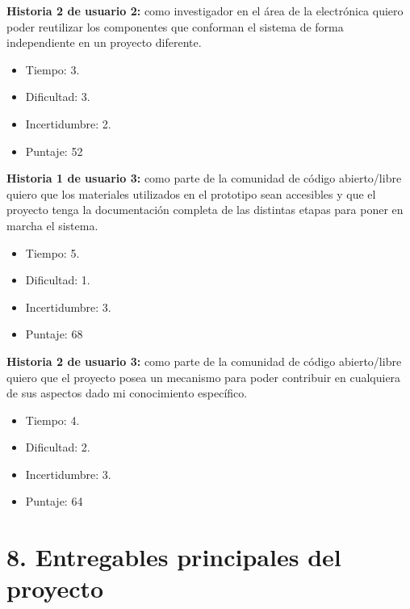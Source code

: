 \documentclass[
11pt, %
codirector, %
]{charter}
\begin{document}
\textbf{Historia 2 de usuario 2:} como investigador en el área de la electrónica quiero poder reutilizar los componentes que conforman el sistema de forma independiente en un proyecto diferente.

\begin{itemize}
	\item Tiempo: 3.
	\item Dificultad: 3.
	\item Incertidumbre: 2.
	\item Puntaje: 52
\end{itemize}

\textbf{Historia 1 de usuario 3:} como parte de la comunidad de código abierto/libre quiero que los materiales utilizados en el prototipo sean accesibles y que el proyecto tenga la documentación completa de las distintas etapas para poner en marcha el sistema.

\begin{itemize}
	\item Tiempo: 5.
	\item Dificultad: 1.
	\item Incertidumbre: 3.
	\item Puntaje: 68
\end{itemize}

\textbf{Historia 2 de usuario 3:} como parte de la comunidad de código abierto/libre quiero que el proyecto posea un mecanismo para poder contribuir en cualquiera de sus aspectos dado mi conocimiento específico.

\begin{itemize}
	\item Tiempo: 4.
	\item Dificultad: 2.
	\item Incertidumbre: 3.
	\item Puntaje: 64
\end{itemize}

\section{8. Entregables principales del proyecto}
\label{sec:entregables}
\end{document}
